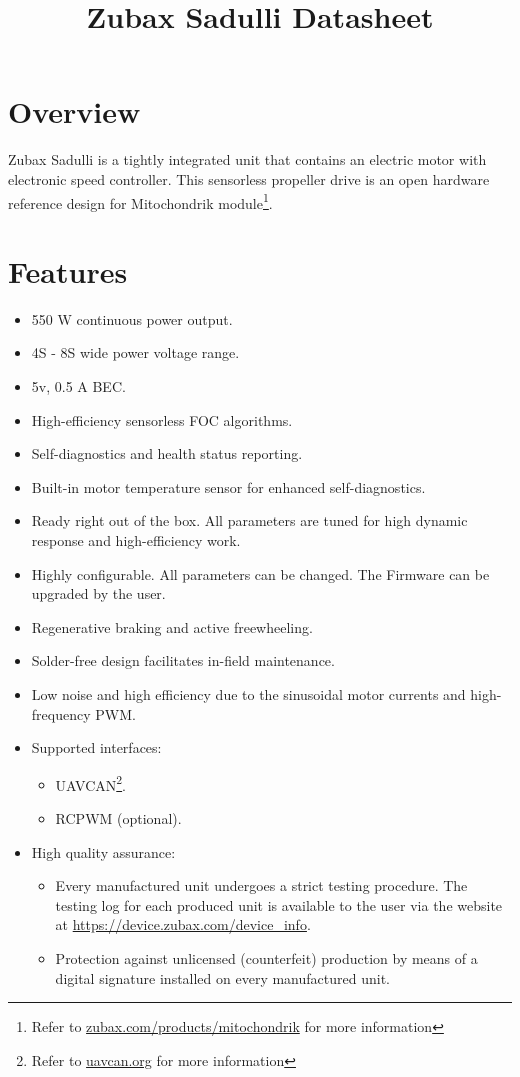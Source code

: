 \documentclass{zubaxdoc}
\title{Zubax Sadulli Datasheet}
\begin{document}
\begin{titlepage}
\section*{Overview}
Zubax Sadulli is a tightly integrated unit that contains an electric motor with electronic speed controller. This sensorless propeller drive is an open hardware reference design for Mitochondrik module\footnote{Refer to \url{zubax.com/products/mitochondrik} for more information}.
\section*{Features}

\begin{itemize}
    \item 550 W continuous power output.
    \item 4S - 8S wide power voltage range.
    \item 5v, 0.5 A BEC.
    \item High-efficiency sensorless FOC algorithms.
    \item Self-diagnostics and health status reporting.
    \item Built-in motor temperature sensor for enhanced \allowbreak{}self-diagnostics.
    \item Ready right out of the box. All parameters are tuned for high dynamic response and high-efficiency work.      
    \item Highly configurable. All parameters can be changed. The Firmware can be upgraded by the user.     
    \item Regenerative braking and active freewheeling. 
    \item Solder-free design facilitates in-field maintenance.
    \item Low noise and high efficiency due to the sinusoidal motor currents and high-frequency PWM.
    \item Supported interfaces:
    \begin{itemize}
        \item UAVCAN\footnote{Refer to \url{uavcan.org} for more information}.
        \item RCPWM (optional).
    \end{itemize}
    \item High quality assurance:
    \begin{itemize}
        \item Every manufactured unit undergoes a strict testing procedure.
        The testing log for each produced unit is available to the user via the website at
        \url{https://device.zubax.com/device_info}.
        \item Protection against unlicensed (counterfeit) production by means of a digital signature installed on every manufactured unit.
     \end{itemize}
\end{itemize}


\end{titlepage}
\end{document}
